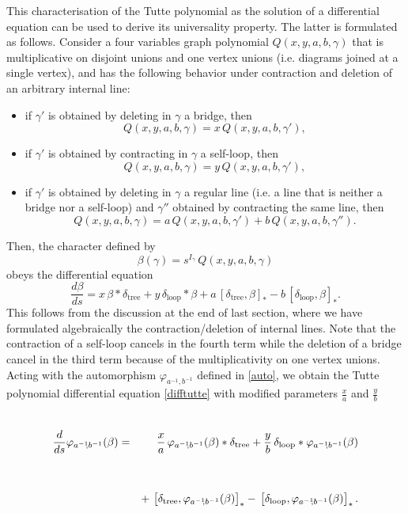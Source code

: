 \documentclass[12pt,here,feynmf]{article}
\begin{document}
This characterisation of the Tutte polynomial as the solution of a differential equation can be used to derive its universality property. The latter is formulated  as follows. Consider a four variables graph polynomial $Q(x,y,a,b,\gamma)$ that is multiplicative on disjoint unions and one vertex unions (i.e. diagrams joined at a single vertex), and has the following  behavior under contraction and deletion of an arbitrary internal line:
\begin{itemize}
\item
if $\gamma'$ is obtained by deleting in $\gamma$ a bridge, then
\begin{equation}
Q(x,y,a,b,\gamma)=x\,Q(x,y,a,b,\gamma'),
\end{equation}
\item
if $\gamma'$ is obtained by contracting in $\gamma$ a self-loop, then
\begin{equation}
Q(x,y,a,b,\gamma)=y\,Q(x,y,a,b,\gamma'),
\end{equation}
\item
if $\gamma'$ is obtained by deleting in $\gamma$ a regular line (i.e. a line that is neither a bridge nor a self-loop) and $\gamma''$ obtained by contracting the same line, then
\begin{equation}
Q(x,y,a,b,\gamma)=a\,Q(x,y,a,b,\gamma')+b\,Q(x,y,a,b,\gamma'').
\end{equation}
\end{itemize}
Then, the character defined by
\begin{equation} 
\beta(\gamma)=s^{I_{\gamma}}\,Q(x,y,a,b,\gamma)
\end{equation}
obeys the differential equation
\begin{equation}
\frac{d\beta}{ds}
=x\,\beta\ast\delta_{\mathrm{tree}}
+y\,\delta_{\mathrm{loop}}\ast\beta+a\,\left[\delta_{\mathrm{tree}},\beta\right]_{\ast}
-b\,\left[\delta_{\mathrm{loop}},\beta\right]_{\ast}.
\end{equation}
This follows from the discussion at the end of last section, where we  have formulated algebraically the contraction/deletion of internal lines. Note that the contraction of a self-loop cancels in the fourth term  while the deletion of a bridge cancel in the third term because of the multiplicativity on one vertex unions. Acting with the automorphism $\varphi_{a^{-1}\!\!,b^{-1}}$ defined in \eqref{auto}, we obtain the Tutte polynomial differential equation \eqref{difftutte} with modified parameters $\frac{x}{a}$ and $\frac{y}{b}$
\begin{eqnarray}
\renewcommand{\baselinestretch}{4}
\frac{d}{ds}\varphi_{a^{-1}\!\!,b^{-1}}(\beta)
&=&\frac{x}{a}\,\varphi_{a^{-1}\!\!,b^{-1}}(\beta)\ast\delta_{\mathrm{tree}}
+\frac{y}{b}\,\delta_{\mathrm{loop}}\ast\varphi_{a^{-1}\!\!,b^{-1}}(\beta)\cr
&&+\,\left[\delta_{\mathrm{tree}},\varphi_{a^{-1}\!\!,b^{-1}}(\beta)\right]_{\ast}
-\,\left[\delta_{\mathrm{loop}},\varphi_{a^{-1}\!\!,b^{-1}}(\beta)\right]_{\ast}.
\end{eqnarray}
\end{document}
